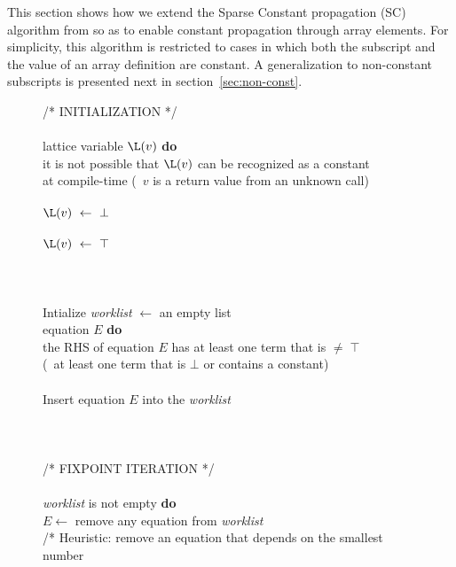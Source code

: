 This section shows how we extend the Sparse
Constant propagation (SC) algorithm from \cite{WeZa91} so as to enable
constant propagation through array elements.
For simplicity, this algorithm is restricted
to cases in which both the subscript and the value of an
array definition are constant.  A generalization to non-constant
subscripts is presented next in section~\ref{sec:non-const}.


\begin{figure}
\begin{center}
\begin{programa}
/* INITIALIZATION */ \\
\\
 lattice variable $\L(v)$ {\bf do}\\
 it is not possible that $\L(v)$ can be recognized as a constant\\
\Td at compile-time (\eg\ $v$ is a return value from an unknown call)\\
\\
\Tc $\L(v)\  \leftarrow\ \bot $\\
\\
\Tc $\L(v)\  \leftarrow\ \top $\\
\\
\\
\\
\Ta Intialize {\it worklist} $\leftarrow$ an empty list\\
 equation $E$ {\bf do}\\
 the RHS of equation $E$ has at least one term that is $\not= \; \top$ \\
\Td  (\ie\ at least one term that is $\bot$ or contains a constant)\\
\\
\Tc  Insert equation $E$ into the {\it worklist}\\
\\
\\
 \\
/* FIXPOINT ITERATION */ \\
\\
 {\it worklist} is not empty {\bf do}\\
\Tb $E \leftarrow$ remove any equation from {\it worklist}\\
\Tb /* Heuristic: remove an equation that depends on the smallest number\\

\end{programa}
\end{center}
\end{figure}
